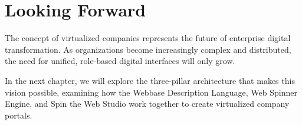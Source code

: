 \section{Looking Forward}
\label{sec:virtualized-forward}

The concept of virtualized companies represents the future of enterprise digital transformation. As organizations become increasingly complex and distributed, the need for unified, role-based digital interfaces will only grow.

In the next chapter, we will explore the three-pillar architecture that makes this vision possible, examining how the Webbase Description Language, Web Spinner Engine, and Spin the Web Studio work together to create virtualized company portals.
